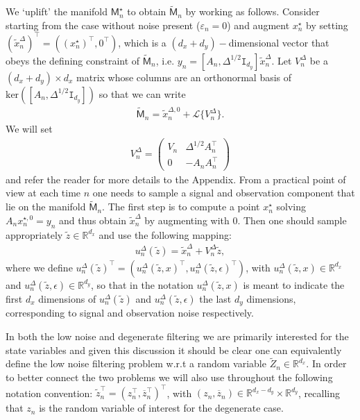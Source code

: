 \documentclass[english,13pt]{article}
\numberwithin{equation}{section}
\begin{document}
We `uplift' the manifold $\mathsf{M}_n^{\star}$ to obtain  $\widetilde{\mathsf{M}}_n$ by working as follows. Consider starting from the case without noise present ($\varepsilon_n=0$) and augment $x_n^{\star}$ by setting  $(\widetilde{x}_n^{\Delta})^{\top}=((x_n^{\star})^{\top},0^{\top})$, which is a $(d_x+d_y)-$dimensional vector that obeys the defining constraint of $\widetilde{\mathsf{M}}_n$, i.e. $y_n=[A_n,\Delta^{1/2}\mathtt{I}_{d_y}]\widetilde{x}_n^{\Delta}$. 
Let $V_n^{\Delta}$ be a $(d_x+d_y)\times d_x$
matrix whose columns are an
 orthonormal basis of $\text{ker}([A_n,\Delta^{1/2}\mathtt{I}_{d_y}])$ so that we can write 
 \begin{align*}
\widetilde{\mathsf{M}}_n = \widetilde{x}_n^{\Delta,0}  + \mathscr{L}\big\{V_n^{\Delta}\big\}.
\end{align*}
We will set
\begin{align}
V_n^\Delta =
\begin{pmatrix}
V_n & \Delta^{1/2} A_n^\top \\
0 & -A_n A_n^\top
\end{pmatrix}
\label{eq:V_n_Delta}
\end{align}
and refer the reader for more details to the Appendix. From a practical point of view at each time $n$ one needs to sample a signal and observation component that lie on the manifold  $\widetilde{\mathsf{M}}_n$. The first step is to compute a point $x_n^{\star}$ solving $A_n x_n^{\star,0}=y_n$ and thus obtain  $\widetilde{x}_n^{\Delta}$ by augmenting with $0$. Then one should sample appropriately $\widetilde{z}\in\mathbb{R}^{d_x}$ and use the following mapping: 
\begin{align}
u_n^{\Delta}(\widetilde{z}) = \widetilde{x}_n^{\Delta} + V_n^{\Delta} \widetilde{z},\label{eq:u_Delta}
\end{align}
where we define  $u_n^{\Delta}(\widetilde{z})^{\top} = (u_n^{\Delta}(\widetilde{z},x)^{\top},u_n^{\Delta}(\widetilde{z},\epsilon)^{\top})$, with
$u_n^{\Delta}(\widetilde{z},x)\in\mathbb{R}^{d_x}$ and $u_n^{\Delta}(\widetilde{z},\epsilon)\in\mathbb{R}^{d_y}$, so that in the notation $u_n^{\Delta}(\widetilde{z},x)$ is meant to indicate the first $d_x$ dimensions of $u_n^{\Delta}(\widetilde{z})$ and  $u_n^{\Delta}(\widetilde{z},\epsilon)$ the last $d_y$ dimensions,  corresponding to signal and observation noise respectively.%

In both the low noise and degenerate filtering we are primarily interested for the state variables and given this discussion it should be clear one can equivalently define the low noise filtering problem w.r.t  a random variable $\widetilde{Z}_n\in\mathbb{R}^{d_x}$.  In order to better connect the two problems  we will also use throughout the following notation convention:  $\widetilde{z}_n^{\top} = (z_n^{\top},\overline{z}_n^{\top})^{\top}$,  with $(z_n,\overline{z}_n)\in \mathbb{R}^{d_x-d_y}\times \mathbb{R}^{d_y}$, recalling that $z_n$ is the random variable of interest for the degenerate case.
\end{document}
